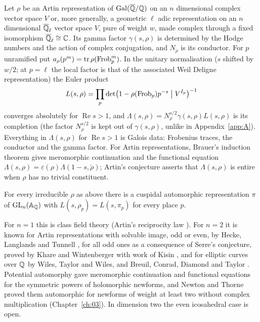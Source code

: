 Let $\rho$ be an Artin representation of $\operatorname{Gal}(\overline{\mathbb{Q}}/\mathbb{Q})$ on an $n$ dimensional complex vector space $V$ or, more generally, a geometric $\ell$ adic representation on an $n$ dimensional $\overline{\mathbb{Q}}_\ell$ vector space $V$, pure of weight $w$, made complex through a fixed isomorphism $\overline{\mathbb{Q}}_\ell\cong\mathbb{C}$. Its gamma factor $\gamma(s,\rho)$ is determined by the Hodge numbers and the action of complex conjugation, and $N_\rho$ is its conductor. For $p$ unramified put $a_\rho(p^m)=\operatorname{tr}\rho(\operatorname{Frob}_p^m)$. In the unitary normalisation ($s$ shifted by $w/2$; at $p=\ell$ the local factor is that of the associated Weil Deligne representation) the Euler product
\[
L(s,\rho)=\prod_p\det\bigl(1-\rho(\operatorname{Frob}_p)p^{-s}\bigm|V^{I_p}\bigr)^{-1}
\]
converges absolutely for $\operatorname{Re}s>1$, and $\Lambda(s,\rho)=N_\rho^{s/2}\gamma(s,\rho)L(s,\rho)$ is its completion (the factor $N_\rho^{s/2}$ is kept out of $\gamma(s,\rho)$, unlike in Appendix~\ref{app:A}). Everything in $\Lambda(s,\rho)$ for $\operatorname{Re}s>1$ is Galois data: Frobenius traces, the conductor and the gamma factor. For Artin representations, Brauer's induction theorem \cite{brauer1947} gives meromorphic continuation and the functional equation $\Lambda(s,\rho)=\varepsilon(\rho)\Lambda(1-s,\check\rho)$; Artin's conjecture \cite{artin1924} asserts that $\Lambda(s,\rho)$ is entire when $\rho$ has no trivial constituent.

\begin{conjecture}\label{conj:recip}
For every irreducible $\rho$ as above there is a cuspidal automorphic representation $\pi$ of $\mathrm{GL}_n(\mathbb{A}_{\mathbb{Q}})$ with $L(s,\rho_p)=L(s,\pi_p)$ for every place $p$.
\end{conjecture}

For $n=1$ this is class field theory (Artin's reciprocity law \cite{artin1927}). For $n=2$ it is known for Artin representations with solvable image, odd or even, by Hecke, Langlands and Tunnell \cite{langlands1980,tunnell1981}, for all odd ones as a consequence of Serre's conjecture, proved by Khare and Wintenberger \cite{kharewintenberger2009,kharewintenberger2009b} with work of Kisin \cite{kisin2009}, and for elliptic curves over $\mathbb{Q}$ by Wiles, Taylor and Wiles, and Breuil, Conrad, Diamond and Taylor \cite{wiles1995,taylorwiles1995,bcdt2001}. Potential automorphy \cite{hsbt2010,blght2011} gave meromorphic continuation and functional equations for the symmetric powers of holomorphic newforms, and Newton and Thorne \cite{newtonthorne2021,newtonthorne2021b} proved them automorphic for newforms of weight at least two without complex multiplication (Chapter~\ref{ch:03}). In dimension two the even icosahedral case is open.

